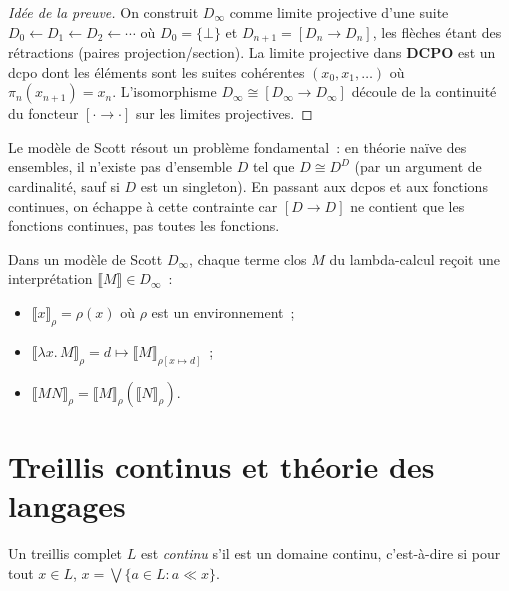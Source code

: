 \begin{proof}[Id\'ee de la preuve]
On construit $D_\infty$ comme limite projective d'une suite
$D_0 \leftarrow D_1 \leftarrow D_2 \leftarrow \cdots$ o\`u $D_0 = \{\bot\}$ et
$D_{n+1} = [D_n \to D_n]$, les fl\`eches \'etant des r\'etractions (paires
projection/section). La limite projective dans $\mathbf{DCPO}$ est un dcpo dont les
\'el\'ements sont les suites coh\'erentes $(x_0, x_1, \ldots)$ o\`u
$\pi_n(x_{n+1}) = x_n$. L'isomorphisme $D_\infty \cong [D_\infty \to D_\infty]$
d\'ecoule de la continuit\'e du foncteur $[\cdot \to \cdot]$ sur les limites projectives.
\end{proof}

\begin{intuition}
Le mod\`ele de Scott r\'esout un probl\`eme fondamental~: en th\'eorie na\"ive des ensembles,
il n'existe pas d'ensemble $D$ tel que $D \cong D^D$ (par un argument de cardinalit\'e,
sauf si $D$ est un singleton). En passant aux dcpos et aux fonctions continues, on
\'echappe \`a cette contrainte car $[D \to D]$ ne contient que les fonctions continues,
pas toutes les fonctions.
\end{intuition}

\begin{definition}
Dans un mod\`ele de Scott $D_\infty$, chaque terme clos $M$ du lambda-calcul re\c{c}oit
une interpr\'etation $\llbracket M \rrbracket \in D_\infty$~:
\begin{itemize}
  \item $\llbracket x \rrbracket_\rho = \rho(x)$ o\`u $\rho$ est un environnement~;
  \item $\llbracket \lambda x.\, M \rrbracket_\rho = d \mapsto \llbracket M \rrbracket_{\rho[x \mapsto d]}$~;
  \item $\llbracket M N \rrbracket_\rho = \llbracket M \rrbracket_\rho (\llbracket N \rrbracket_\rho)$.
\end{itemize}
\end{definition}

\section{Treillis continus et th\'eorie des langages}

\begin{definition}
Un treillis complet $L$ est \emph{continu} s'il est un domaine continu, c'est-\`a-dire
si pour tout $x \in L$, $x = \bigvee \{a \in L : a \ll x\}$.
\end{definition}

